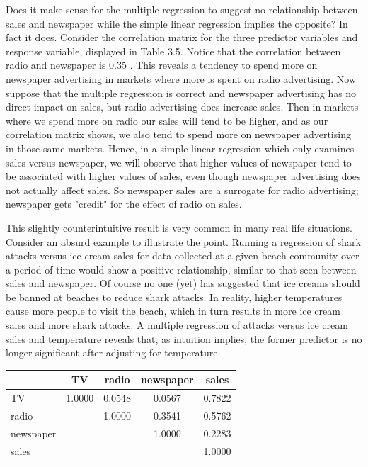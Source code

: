 \documentclass[10pt]{article}
\begin{document}
Does it make sense for the multiple regression to suggest no relationship between sales and newspaper while the simple linear regression implies the opposite? In fact it does. Consider the correlation matrix for the three predictor variables and response variable, displayed in Table 3.5. Notice that the correlation between radio and newspaper is 0.35 . This reveals a tendency to spend more on newspaper advertising in markets where more is spent on radio advertising. Now suppose that the multiple regression is correct and newspaper advertising has no direct impact on sales, but radio advertising does increase sales. Then in markets where we spend more on radio our sales will tend to be higher, and as our correlation matrix shows, we also tend to spend more on newspaper advertising in those same markets. Hence, in a simple linear regression which only examines sales versus newspaper, we will observe that higher values of newspaper tend to be associated with higher values of sales, even though newspaper advertising does not actually affect sales. So newspaper sales are a surrogate for radio advertising; newspaper gets "credit" for the effect of radio on sales.

This slightly counterintuitive result is very common in many real life situations. Consider an absurd example to illustrate the point. Running a regression of shark attacks versus ice cream sales for data collected at a given beach community over a period of time would show a positive relationship, similar to that seen between sales and newspaper. Of course no one (yet) has suggested that ice creams should be banned at beaches to reduce shark attacks. In reality, higher temperatures cause more people to visit the beach, which in turn results in more ice cream sales and more shark attacks. A multiple regression of attacks versus ice cream sales and temperature reveals that, as intuition implies, the former predictor is no longer significant after adjusting for temperature.

\begin{center}
\begin{tabular}{l|cccc}
 & TV & radio & newspaper & sales \\
\hline
TV & 1.0000 & 0.0548 & 0.0567 & 0.7822 \\
radio &  & 1.0000 & 0.3541 & 0.5762 \\
newspaper &  &  & 1.0000 & 0.2283 \\
sales &  &  &  & 1.0000 \\
\end{tabular}
\end{center}
\end{document}
